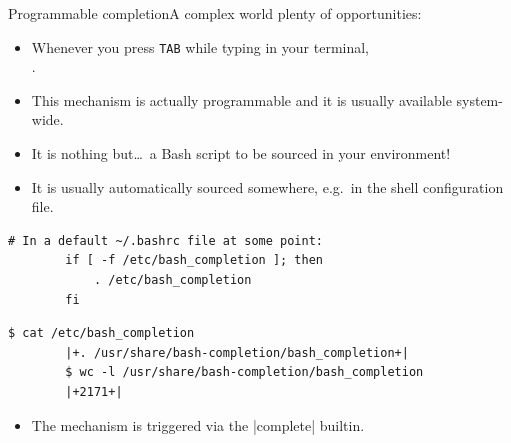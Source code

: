 
\begin{frame}[fragile]{Programmable completion}{A complex world plenty of opportunities: \enspace{}}
    \vspace{-2mm}
    \begin{itemize}
        \item Whenever you press \texttt{TAB} while typing in your terminal,\\ .
        \item This mechanism is actually programmable and it is usually available system-wide.
        \item It is nothing but\ldots\ a Bash script to be sourced in your environment!
        \item It is usually automatically sourced somewhere, e.g.\ in the shell configuration file.
    \end{itemize}
    \begin{lstlisting}[style=myBash, numbers=none, aboveskip=2mm]
        # In a default ~/.bashrc file at some point:
        if [ -f /etc/bash_completion ]; then
            . /etc/bash_completion
        fi
    \end{lstlisting}
    \begin{lstlisting}[style=myBash, numbers=none, aboveskip=2mm, belowskip=-5mm]
        $ cat /etc/bash_completion
        |+. /usr/share/bash-completion/bash_completion+|
        $ wc -l /usr/share/bash-completion/bash_completion
        |+2171+|
    \end{lstlisting}
    \begin{itemize}
        \item The mechanism is triggered via the \bash|complete| builtin.
    \end{itemize}
\end{frame}
